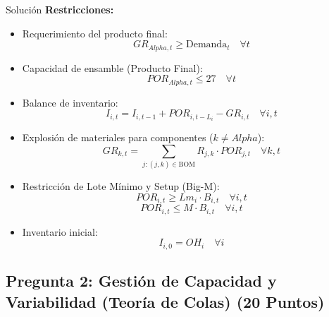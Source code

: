 \documentclass[11pt, a4paper]{article}
\begin{document}
\begin{ejercicio}{Solución}
  \textbf{Restricciones:}
  \begin{itemize}
    \item Requerimiento del producto final:
      \begin{equation}
        GR_{Alpha,t} \ge \text{Demanda}_t \quad \forall t
      \end{equation}
    \item Capacidad de ensamble (Producto Final):
      \begin{equation}
        POR_{Alpha,t} \le 27 \quad \forall t
      \end{equation}
    \item Balance de inventario:
      \begin{equation}
        I_{i,t} = I_{i,t-1} + POR_{i,t-L_i} - GR_{i,t} \quad \forall i, t
      \end{equation}
    \item Explosión de materiales para componentes ($k \ne Alpha$):
      \begin{equation}
        GR_{k,t} = \sum_{j: (j,k) \in \text{BOM}} R_{j,k} \cdot POR_{j,t} \quad \forall k, t
      \end{equation}
    \item Restricción de Lote Mínimo y Setup (Big-M):
      \begin{equation}
        POR_{i,t} \ge Lm_i \cdot B_{i,t} \quad \forall i, t
      \end{equation}
      \begin{equation}
        POR_{i,t} \le M \cdot B_{i,t} \quad \forall i, t
      \end{equation}
    \item Inventario inicial:
      \begin{equation}
        I_{i,0} = OH_i \quad \forall i
      \end{equation}
  \end{itemize}

\end{ejercicio}

\newpage

\subsection*{Pregunta 2: Gestión de Capacidad y Variabilidad (Teoría de Colas) (20 Puntos)}
\end{document}
